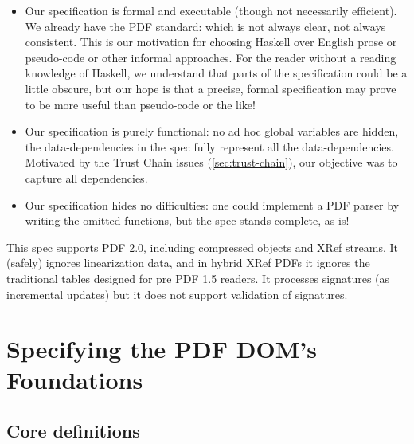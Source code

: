 \begin{itemize}
\item Our specification is formal and executable (though not
  necessarily efficient).
  We already have the PDF standard: which is not always clear, not always
  consistent. 
  This is our motivation for choosing Haskell over English prose or
  pseudo-code or other informal approaches.
  For the reader
  without a reading knowledge of Haskell, we understand that parts of
  the specification could be a little obscure, but our hope is that a
  precise, formal specification may prove to be more useful than
  pseudo-code or the like!
  
\item Our specification is purely functional: no ad hoc global variables are
  hidden, the data-dependencies in the spec fully represent all the
  data-dependencies.  Motivated by the Trust Chain issues
  (\cref{sec:trust-chain}), our objective was to capture all dependencies.
  
\item Our specification hides no difficulties: one could implement a PDF parser
  by writing the omitted functions, but the spec stands complete, as
  is!
\end{itemize}

This spec supports PDF 2.0, including compressed objects and XRef streams.
%
It (safely) ignores linearization data, and in hybrid XRef PDFs
it ignores the traditional \xref{} tables designed for pre PDF 1.5 readers.
It processes signatures (as incremental updates) but it does not support
validation of signatures.

\section{Specifying the PDF DOM's Foundations }
\label{sec:specifying}

\subsection{Core definitions}
\label{sec:core}
\iffalse
\begin{code}
{-# LANGUAGE EmptyDataDecls, TypeOperators, LambdaCase #-}
module Spec where
import           Control.Monad
import           Data.Char
import           Data.Foldable(foldlM)
import qualified Data.IntSet as IntSet
import           Data.List
import qualified Data.Map as M
import           Data.Map(Map)
import           Types
import           Utils
import           Primitives
import           Streams
\end{code}
\fi

